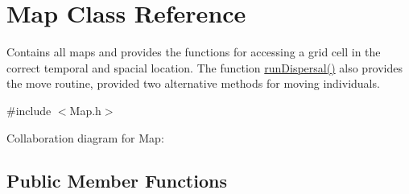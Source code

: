 \hypertarget{class_map}{}\section{Map Class Reference}
\label{class_map}


Contains all maps and provides the functions for accessing a grid cell in the correct temporal and spacial location. The function \hyperlink{class_map_a7c5b0623134a33511d7c17626c967176}{run\+Dispersal()} also provides the move routine, provided two alternative methods for moving individuals.  




{\ttfamily \#include $<$Map.\+h$>$}



Collaboration diagram for Map\+:
\subsection*{Public Member Functions}
